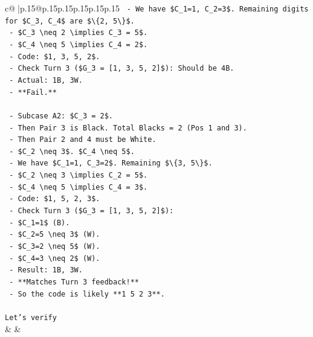 \documentclass{article}
\begin{document}
{\begin{supertabular}{c@{$\;$}|p{.15\linewidth}@{}p{.15\linewidth}p{.15\linewidth}p{.15\linewidth}p{.15\linewidth}p{.15\linewidth}}
{{{\texttt{    {-} We have \$C\_1=1, C\_2=3\$. Remaining digits for \$C\_3, C\_4\$ are \$\textbackslash{}\{2, 5\textbackslash{}\}\$.} \\
\texttt{    {-} \$C\_3 \textbackslash{}neq 2 \textbackslash{}implies C\_3 = 5\$.} \\
\texttt{    {-} \$C\_4 \textbackslash{}neq 5 \textbackslash{}implies C\_4 = 2\$.} \\
\texttt{    {-} Code: \$1, 3, 5, 2\$.} \\
\texttt{    {-} Check Turn 3 (\$G\_3 = {[}1, 3, 5, 2{]}\$): Should be 4B.} \\
\texttt{    {-} Actual: 1B, 3W.} \\
\texttt{    {-} **Fail.**} \\
\\ 
\texttt{  {-} Subcase A2: \$C\_3 = 2\$.} \\
\texttt{    {-} Then Pair 3 is Black. Total Blacks = 2 (Pos 1 and 3).} \\
\texttt{    {-} Then Pair 2 and 4 must be White.} \\
\texttt{    {-} \$C\_2 \textbackslash{}neq 3\$. \$C\_4 \textbackslash{}neq 5\$.} \\
\texttt{    {-} We have \$C\_1=1, C\_3=2\$. Remaining \$\textbackslash{}\{3, 5\textbackslash{}\}\$.} \\
\texttt{    {-} \$C\_2 \textbackslash{}neq 3 \textbackslash{}implies C\_2 = 5\$.} \\
\texttt{    {-} \$C\_4 \textbackslash{}neq 5 \textbackslash{}implies C\_4 = 3\$.} \\
\texttt{    {-} Code: \$1, 5, 2, 3\$.} \\
\texttt{    {-} Check Turn 3 (\$G\_3 = {[}1, 3, 5, 2{]}\$):} \\
\texttt{      {-} \$C\_1=1\$ (B).} \\
\texttt{      {-} \$C\_2=5 \textbackslash{}neq 3\$ (W).} \\
\texttt{      {-} \$C\_3=2 \textbackslash{}neq 5\$ (W).} \\
\texttt{      {-} \$C\_4=3 \textbackslash{}neq 2\$ (W).} \\
\texttt{      {-} Result: 1B, 3W.} \\
\texttt{      {-} **Matches Turn 3 feedback!**} \\
\texttt{    {-} So the code is likely **1 5 2 3**.} \\
\\ 
\texttt{Let's verify} \\
            }
        }
    }
    & & \\ \\


\end{supertabular}}
\end{document}
